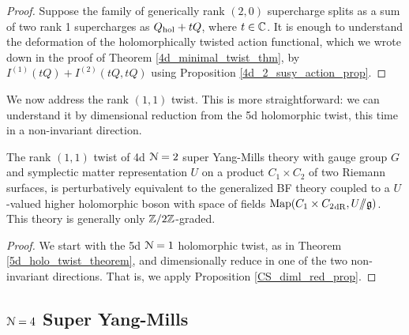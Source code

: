 \documentclass[10pt, oneside]{article}
\newcommand{\ham}{/\!\!/}
\begin{document}
\begin{proof}
Suppose the family of generically rank $(2,0)$ supercharge splits as a sum of two rank 1 supercharges as $Q_{\mathrm{hol}} + tQ$, where $t \in \mathbb C$.  It is enough to understand the deformation of the holomorphically twisted action functional, which we wrote down in the proof of Theorem \ref{4d_minimal_twist_thm}, by $I^{(1)}(tQ) + I^{(2)}(tQ,tQ)$ using Proposition \ref{4d_2_susy_action_prop}.

\end{proof}

We now address the rank $(1,1)$ twist.  This is more straightforward: we can understand it by dimensional reduction from the 5d holomorphic twist, this time in a non-invariant direction.

\begin{theorem} \label{4d_11_twist_thm}
The rank $(1,1)$ twist of 4d $\mathcal{N}=2$ super Yang-Mills theory with gauge group $G$ and symplectic matter representation $U$ on a product $C_1 \times C_2$ of two Riemann surfaces, is perturbatively equivalent to the generalized BF theory coupled to a $U$-valued higher holomorphic boson with space of fields $\mr{Map}(C_1 \times {C_2}_{\mr{dR}}, U\ham \gg)$.  This theory is generally only $\mathbb Z/2\mathbb Z$-graded.
\end{theorem}

\begin{proof}
We start with the 5d $\mathcal{N}=1$ holomorphic twist, as in Theorem \ref{5d_holo_twist_theorem}, and dimensionally reduce in one of the two non-invariant directions.  That is, we apply Proposition \ref{CS_diml_red_prop}.
\end{proof}



\subsection{\texorpdfstring{$\mathcal N=4$}{N=4} Super Yang-Mills} \label{4d_4_section}
\end{document}
